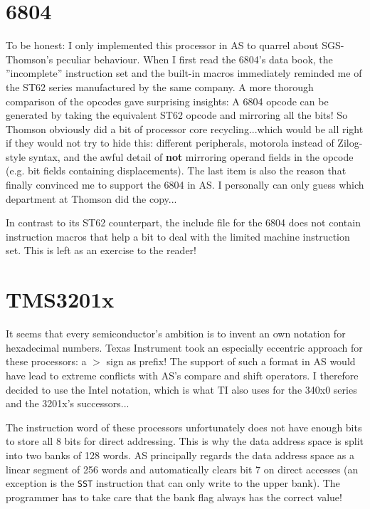 \documentclass[12pt,twoside]{report}
\newcommand{\bb}[1]{{\bf #1}}
\newcommand{\tty}[1]{{\tt #1}}
\begin{document}
\section{6804}

To be honest: I only implemented this processor in AS to quarrel
about SGS-Thomson's peculiar behaviour.  When I first read the 6804's
data book, the ''incomplete'' instruction set and the built-in macros
immediately reminded me of the ST62 series manufactured by the same
company.  A more thorough comparison of the opcodes gave surprising
insights: A 6804 opcode can be generated by taking the equivalent
ST62 opcode and mirroring all the bits!  So Thomson obviously did a
bit of processor core recycling...which would be all right if they
would not try to hide this:  different peripherals, motorola instead
of Zilog-style syntax, and the awful detail of \bb{not} mirroring operand
fields in the opcode (e.g. bit fields containing displacements).  The
last item is also the reason that finally convinced me to support the
6804 in AS.  I personally can only guess which department at Thomson
did the copy...

In contrast to its ST62 counterpart, the include file for the 6804
does not contain instruction macros that help a bit to deal with the
limited machine instruction set.  This is left as an exercise to the
reader!


\section{TMS3201x}

It seems that every semiconductor's ambition is to invent an own
notation for hexadecimal numbers.  Texas Instrument took an
especially eccentric approach for these processors: a $>$ sign as
prefix!  The support of such a format in AS would have lead to
extreme conflicts with AS's compare and shift operators.  I therefore
decided to use the Intel notation, which is what TI also uses for the
340x0 series and the 3201x's successors...

The instruction word of these processors unfortunately does not have
enough bits to store all 8 bits for direct addressing.  This is why
the data address space is split into two banks of 128 words.  AS
principally regards the data address space as a linear segment of 256
words and automatically clears bit 7 on direct accesses (an exception
is the \tty{SST} instruction that can only write to the upper bank).  The
programmer has to take care that the bank flag always has the correct
value!
\end{document}
